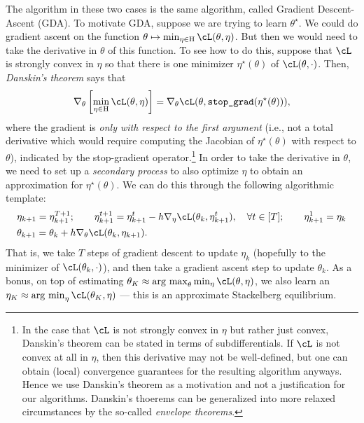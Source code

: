 \documentclass[../../book-main.tex]{subfiles}
\begin{document}
The algorithm in these two cases is the same algorithm, called Gradient Descent-Ascent (GDA). To motivate GDA, suppose we are trying to learn \(\theta^{\star}\). We could do gradient ascent on the function \(\theta \mapsto \min_{\eta \in \Eta}\cL(\theta, \eta)\). But then we would need to take the derivative in \(\theta\) of this function. To see how to do this, suppose that \(\cL\) is strongly convex in \(\eta\) so that there is one minimizer \(\eta^{\star}(\theta)\) of \(\cL(\theta, \cdot)\). Then, \textit{Danskin's theorem} says that
\begin{equation}
    \nabla_{\theta}\bs{\min_{\eta \in \Eta}\cL(\theta, \eta)} = \nabla_{\theta}\cL(\theta, \texttt{stop\_grad}(\eta^{\star}(\theta))),
\end{equation}
where the gradient is \textit{only with respect to the first argument} (i.e., not a total derivative which would require computing the Jacobian of \(\eta^{\star}(\theta)\) with respect to \(\theta\)), indicated by the stop-gradient operator.\footnote{In the case that \(\cL\) is not strongly convex in \(\eta\) but rather just convex, Danskin's theorem can be stated in terms of subdifferentials. If \(\cL\) is not convex at all in \(\eta\), then this derivative may not be well-defined, but one can obtain (local) convergence guarantees for the resulting algorithm anyways. Hence we use Danskin's theorem as a motivation and not a justification for our algorithms. Danskin's thoerems can be generalized into more relaxed circumstances by the so-called \textit{envelope theorems}.}
In order to take the derivative in \(\theta\), we need to set up a \textit{secondary process} to also optimize \(\eta\) to obtain an approximation for \(\eta^{\star}(\theta)\). We can do this through the following algorithmic template:
\begin{align}
    &\eta_{k + 1} = \eta_{k + 1}^{T + 1}; \qquad \eta_{k + 1}^{t + 1} = \eta_{k + 1}^{t} - h \nabla_{\eta} \cL(\theta_{k}, \eta_{k + 1}^{t}), \quad \forall t \in [T]; \qquad \eta_{k + 1}^{1} = \eta_{k} \\
    &\theta_{k + 1} = \theta_{k} + h \nabla_{\theta}\cL(\theta_{k}, \eta_{k + 1}).
\end{align}
That is, we take \(T\) steps of gradient descent to update \(\eta_{k}\) (hopefully to the minimizer of \(\cL(\theta_{k}, \cdot)\)), and then take a gradient ascent step to update \(\theta_{k}\). As a bonus, on top of estimating \(\theta_{K} \approx \argmax_{\theta}\min_{\eta}\cL(\theta, \eta)\), we also learn an \(\eta_{K} \approx \argmin_{\eta}\cL(\theta_{K}, \eta)\) --- this is an approximate Stackelberg equilibrium.
\end{document}
